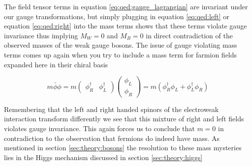 The field tensor terms in equation \ref{eq:qed:gauge_lagrangian} are invariant
under our gauge transformations, but simply plugging in equation
\ref{eq:qed:left} or equation \ref{eq:qed:right} into the mass terms shows that
these terms violate gauge invariance thus implying $M_{W} = 0$ and $M_{B} = 0$
in direct contradiction of the observed masses of the weak gauge bosons.  The
issue of gauge violating mass terms comes up again when you try to include a
mass term for farmion fields expanded here in their chiral basis

\begin{equation}
m\bar{\phi}\phi = m \left( \begin{matrix}\phi^{\dagger}_{R} &
\phi^{\dagger}_{L} \end{matrix} \right) \left( \begin{matrix} \phi_{L}
\\ \phi_{R} \end{matrix} \right) = m(\phi^{\dagger}_{R}\phi_{L} +
\phi^{\dagger}_{L}\phi_{R})
\end{equation}

Remembering that the left and right handed spinors of the electroweak
interaction transform differently we see that this mixture of right and left
fields violates gauge invariance. This again forces us to conclude that $m = 0$
in contradiction to the observation that fermions do indeed have mass. As
mentioned in section \ref{sec:theory:bosons} the resolution to these mass
mysteries lies in the Higgs mechanism discussed in section
\ref{sec:theory:higgs}
